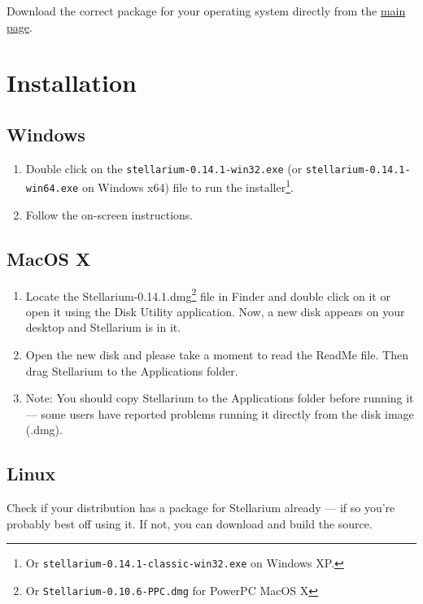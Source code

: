 Download the correct package for your operating system directly from the
\href{http://stellarium.org}{main page}.

\section{Installation}\label{installation-stellarium}

\subsection{Windows}\label{windows}

\begin{enumerate}
\item
  Double click on the \texttt{stellarium-0.14.1-win32.exe} (or
  \texttt{stellarium-0.14.1-win64.exe} on Windows x64) file to run the
  installer\footnote{Or \texttt{stellarium-0.14.1-classic-win32.exe} on
    Windows XP.}.
\item
  Follow the on-screen instructions.
\end{enumerate}

\subsection{MacOS X}\label{macos-x}

\begin{enumerate}
\item
  Locate the Stellarium-0.14.1.dmg\footnote{Or
    \texttt{Stellarium-0.10.6-PPC.dmg} for PowerPC MacOS X} file in
  Finder and double click on it or open it using the Disk Utility
  application. Now, a new disk appears on your desktop and Stellarium is
  in it.
\item
  Open the new disk and please take a moment to read the ReadMe file.
  Then drag Stellarium to the Applications folder.
\item
  Note: You should copy Stellarium to the Applications folder before
  running it --- some users have reported problems running it directly
  from the disk image (.dmg).
\end{enumerate}

\subsection{Linux}\label{linux}

Check if your distribution has a package for Stellarium already --- if
so you're probably best off using it. If not, you can download and build
the source.

